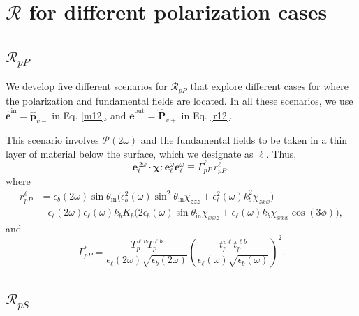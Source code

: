 \documentclass[10pt]{book}
\begin{document}

\section{\texorpdfstring{$\mathcal{R}$}{R} for different polarization cases}

\subsection{\texorpdfstring{$\mathcal{R}_{pP}$}{RpP}}

We develop five different scenarios for $\mathcal{R}_{pP}$ that explore
different cases for where the polarization and fundamental fields are located.
In all these scenarios, we use
$\hat{\mathbf{e}}^{\mathrm{in}}=\hat{\mathbf{p}}_{v-}$ in Eq. \eqref{m12}, and
$\hat{\mathbf{e}}^{\mathrm{out}}=\hat{\mathbf{P}}_{v+}$ in Eq.
\eqref{r12}.

This scenario involves $\mathcal{P}(2\omega)$ and the fundamental fields to be
taken in a thin layer of material below the surface, which we designate as
$\ell$. Thus,
\begin{equation*}\label{m80}
\mathbf{e}^{\,2\omega}_{\ell}\cdot\boldsymbol{\chi}:
\mathbf{e}^\omega_{\ell}\mathbf{e}^\omega_{\ell}
\equiv\Gamma^{\ell}_{pP}\,r^{\ell}_{pP}
,
\end{equation*}
where
\begin{align}\label{m81}
r^{\ell}_{pP} &=
\epsilon_{b}(2\omega)\sin\theta_{\mathrm{in}}
\Big(
  \epsilon^2_{b}(\omega)\sin^2\theta_{\mathrm{in}}\chi_{zzz}
+ \epsilon^2_{\ell}(\omega)k^2_{b}\chi_{zxx}
\Big)\\
&- \epsilon_{\ell}(2\omega)\epsilon_{\ell}(\omega)k_{b}K_{b}
\Big(
  2\epsilon_{b}(\omega)\sin\theta_{\mathrm{in}}\chi_{xxz}
+ \epsilon_{\ell}(\omega)k_{b}\chi_{xxx}\cos(3\phi) 
\Big),\nonumber
\end{align}
and  
\begin{equation}\label{m79}
\Gamma^{\ell}_{pP}=
\frac{T_{p}^{\ell v}T^{\ell b}_{p}}
     {\epsilon_{\ell}(2\omega)\sqrt{\epsilon_{b}(2\omega)}}
\left(
\frac{t_{p}^{v\ell}t^{\ell b}_{p}}
     {\epsilon_{\ell}(\omega)\sqrt{\epsilon_{b}(\omega)}}
\right)^{2} 
.  
\end{equation}


\subsection{\texorpdfstring{$\mathcal{R}_{pS}$}{RpS}}
\end{document}
